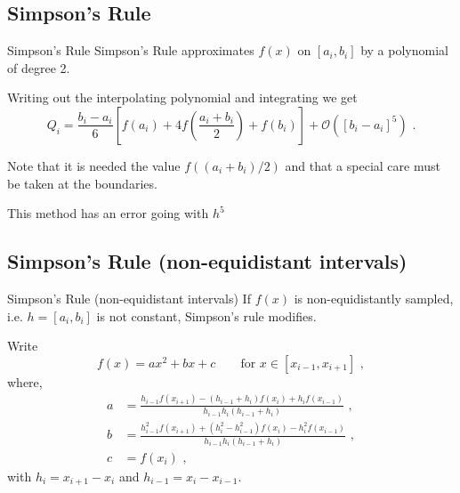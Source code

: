 \documentclass[11pt]{beamer}
\begin{document}
\subsection{Simpson's Rule}
\begin{frame}[fragile]{Simpson's Rule}
Simpson's Rule approximates $f(x)$ on $[a_i,b_i]$ by a polynomial of degree 2. \\
\pause
\bigskip

Writing out the interpolating
polynomial  and integrating we get
\begin{equation}
Q_i = \frac{b_i-a_i}{6} \left[f(a_i) + 4f\left(\frac{a_i+b_i}{2}\right) + f(b_i) \right] + \mathcal{O}([b_i-a_i]^5)\,\,.
\end{equation}
 \pause
 
Note that it is needed the value $f((a_i + b_i)/2)$ and that a special care must be taken at the boundaries.\\

\pause
\bigskip

This method has an error going with $h^5$
\end{frame}


\subsection{Simpson's Rule (non-equidistant intervals)}
\begin{frame}[fragile]{Simpson's Rule (non-equidistant intervals)}
If $f(x)$ is non-equidistantly sampled, i.e.  $h =
[a_i,b_i]$ is not constant, Simpson's rule modifies.
\pause
\bigskip

Write
\begin{equation}
f(x) = a x^2 + b x + c\hspace{2em} \text{for } x \in [x_{i-1},x_{i+1}]\,\,,
\end{equation}
where,
\begin{equation}
\begin{aligned}
a &= \frac{h_{i-1} f(x_{i+1}) - (h_{i-1}+h_i) f(x_{i}) + h_i f(x_{i-1})}
{h_{i-1} h_i(h_{i-1} + h_i)}\,\,,\\
b & = \frac{h_{i-1}^2 f(x_{i+1}) + (h_i^2 - h_{i-1}^2) f(x_i) - h_i^2 f(x_{i-1})}
{h_{i-1} h_i (h_{i-1} + h_i)}\,\,,\\
c & = f(x_i)\,\,,
\end{aligned}
\end{equation}
with $h_i = x_{i+1} - x_i$ and $h_{i-1} = x_i - x_{i-1}$. 
\end{frame}
\end{document}

